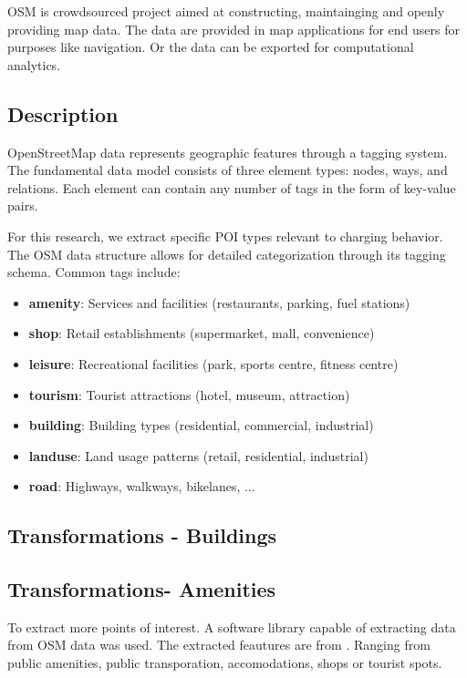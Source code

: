 \acrlong{OSM} is crowdsourced project aimed at constructing, maintainging and openly providing map data. The data are provided in map applications for end users for purposes like navigation. Or the data can be exported for computational analytics.

\subsection{Description}

OpenStreetMap data represents geographic features through a tagging system. The fundamental data model consists of three element types: nodes, ways, and relations. Each element can contain any number of tags in the form of key-value pairs.

For this research, we extract specific POI types relevant to charging behavior. The OSM data structure allows for detailed categorization through its tagging schema. Common tags include:

\begin{itemize}
    \item \textbf{amenity}: Services and facilities (restaurants, parking, fuel stations)
    \item \textbf{shop}: Retail establishments (supermarket, mall, convenience)
    \item \textbf{leisure}: Recreational facilities (park, sports centre, fitness centre)
    \item \textbf{tourism}: Tourist attractions (hotel, museum, attraction)
    \item \textbf{building}: Building types (residential, commercial, industrial)
    \item \textbf{landuse}: Land usage patterns (retail, residential, industrial)
    \item \textbf{road}: Highways, walkways, bikelanes, ...
\end{itemize}

\subsection{Transformations - Buildings}
\subsection{Transformations- Amenities}

To extract more points of interest. A software library  capable of extracting data from \acrshort{OSM} data was used. The extracted feautures are from . Ranging from public amenities, public transporation, accomodations, shops or tourist spots.

